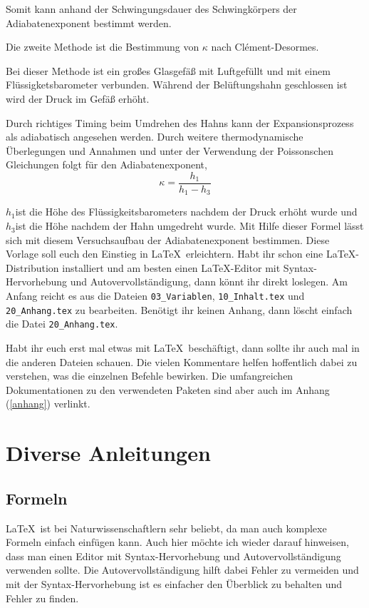 Somit kann anhand der Schwingungsdauer des Schwingkörpers der Adiabatenexponent
bestimmt werden.

Die zweite Methode ist die Bestimmung von $\kappa$ nach Clément-Desormes.

Bei dieser Methode ist ein großes Glasgefäß mit Luftgefüllt und mit
einem Flüssigketsbarometer verbunden. Während der Belüftungshahn geschlossen
ist wird der Druck im Gefäß erhöht.

Durch richtiges Timing beim Umdrehen des Hahns kann der Expansionsprozess
als adiabatisch angesehen werden. Durch weitere thermodynamische Überlegungen
und Annahmen und unter der Verwendung der Poissonschen Gleichungen
folgt für den Adiabatenexponent,
\begin{equation}
\kappa=\frac{h_{1}}{h_{1}-h_{3}}\label{eq:adiabatenexponent2}
\end{equation}


$h_{1}$ist die Höhe des Flüssigkeitsbarometers nachdem der Druck
erhöht wurde und $h_{3}$ist die Höhe nachdem der Hahn umgedreht wurde.
Mit Hilfe dieser Formel lässt sich mit diesem Versuchsaufbau der Adiabatenexponent
bestimmen.
Diese Vorlage soll euch den Einstieg in \LaTeX\ erleichtern. Habt ihr schon eine \LaTeX-Distribution installiert und am besten einen \LaTeX-Editor mit Syntax-Hervorhebung und Autovervollständigung, dann könnt ihr direkt loslegen. Am Anfang reicht es aus die Dateien \verb+03_Variablen+, \verb+10_Inhalt.tex+ und \verb+20_Anhang.tex+ zu bearbeiten. Benötigt ihr keinen Anhang, dann löscht einfach die Datei \verb+20_Anhang.tex+.

Habt ihr euch erst mal etwas mit \LaTeX\ beschäftigt, dann sollte ihr auch mal in die anderen Dateien schauen. Die vielen Kommentare helfen hoffentlich dabei zu verstehen, was die einzelnen Befehle bewirken. Die umfangreichen Dokumentationen zu den verwendeten Paketen sind aber auch im Anhang (\ref{anhang}) verlinkt.

\newpage
\section{Diverse Anleitungen}
\subsection{Formeln}

\LaTeX\ ist bei Naturwissenschaftlern sehr beliebt, da man auch komplexe Formeln einfach einfügen kann. Auch hier möchte ich wieder darauf hinweisen, dass man einen Editor mit Syntax-Hervorhebung und Autovervollständigung verwenden sollte. Die Autovervollständigung hilft dabei Fehler zu vermeiden und mit der Syntax-Hervorhebung ist es einfacher den Überblick zu behalten und Fehler zu finden.


